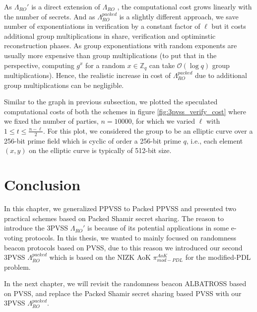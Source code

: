 As $\Lambda_{RO}'$ is a direct extension of $\Lambda_{RO}$ 
\cite{cryptoeprint:2025/576}, the computational 
cost grows linearly with the number of secrets. And as $\Lambda_{RO}^{packed}$ is a slightly 
different approach, we save number of exponentiations in verification by a constant factor of 
$\ell$ but it costs additional group multiplications in share, verification and optiminstic 
reconstruction phases. As group exponentiations with random exponents are usually more 
expensive than group multiplications (to put that in the perspective, computing $g^x$ for 
a random $x\in\mathbb{Z}_q$ can take $\mathcal{O}(\log{q})$ group multiplications). 
Hence, the realistic increase in cost of $\Lambda_{RO}^{packed}$ due to additional 
group multiplications can be negligible. 




Similar to the graph in previous subsection, we plotted the speculated computational costs of both the 
schemes in figure \ref{fig:3pvss_verify_cost} where we fixed the number of parties, $n=10000$, 
for which we varied $\ell$ with $1\leq t\leq \frac{n-\ell}{2}$. For this plot, we 
considered the group to be an elliptic curve over a 256-bit prime field which is 
cyclic of order a 256-bit prime $q$, i.e., each element $(x,y)$ on the elliptic curve 
is typically of 512-bit size.\par




% 


\section{Conclusion}
In this chapter, we generalized PPVSS to Packed PPVSS and presented two practical schemes based on 
Packed Shamir secret sharing. The reason to introduce the 3PVSS $\Lambda_{RO}'$ is because of its 
potential applications in some e-voting protocols. In this thesis, we wanted to mainly focused on randomness beacon 
protocols based on PVSS, due to this reason we introduced our second 3PVSS $\Lambda_{RO}^{packed}$ which is based on the
NIZK AoK $\pi_{mod-PDL}^{AoK}$ for the modified-PDL problem.\par

In the next chapter, we will revisit the randomness beacon ALBATROSS \cite{cryptoeprint:2020/644} based on PVSS, 
and replace the Packed Shamir secret sharing based PVSS with our 3PVSS $\Lambda_{RO}^{packed}$. 

